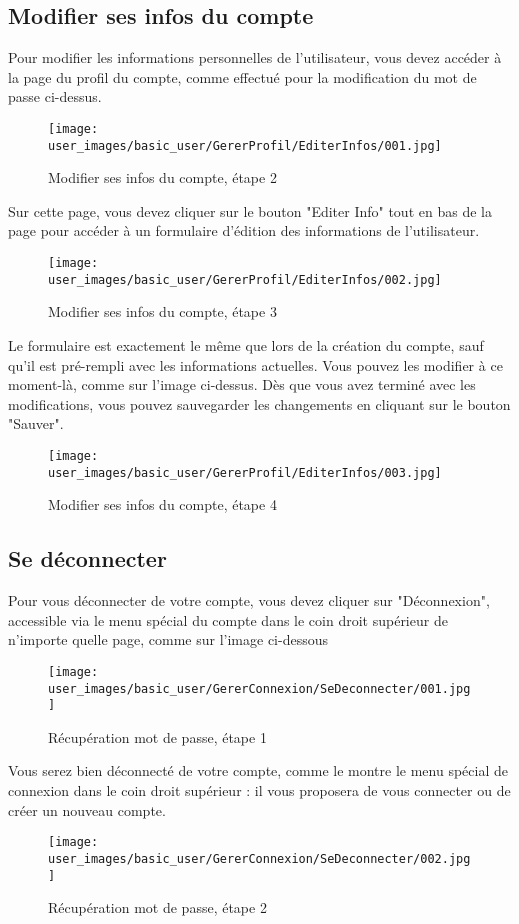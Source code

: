 \subsection{Modifier ses infos du compte}

Pour modifier les informations personnelles de l'utilisateur, vous devez accéder à la page du profil du compte, comme effectué pour la modification du mot de passe ci-dessus.

\begin{figure}[H]
\centering
\texttt{[image: user\_images/basic\_user/GererProfil/EditerInfos/001.jpg]}
\caption{Modifier ses infos du compte, étape 2}
\end{figure}

Sur cette page, vous devez cliquer sur le bouton "Editer Info" tout en bas de la page pour accéder à un formulaire d'édition des informations de l'utilisateur.

\begin{figure}[H]
\centering
\texttt{[image: user\_images/basic\_user/GererProfil/EditerInfos/002.jpg]}
\caption{Modifier ses infos du compte, étape 3}
\end{figure}

Le formulaire est exactement le même que lors de la création du compte, sauf qu'il est pré-rempli avec les informations actuelles. Vous pouvez les modifier à ce moment-là, comme sur l'image ci-dessus. Dès que vous avez terminé avec les modifications, vous pouvez sauvegarder les changements en cliquant sur le bouton "Sauver".

\begin{figure}[H]
\centering
\texttt{[image: user\_images/basic\_user/GererProfil/EditerInfos/003.jpg]}
\caption{Modifier ses infos du compte, étape 4}
\end{figure}

\subsection{Se déconnecter}

Pour vous déconnecter de votre compte, vous devez cliquer sur "Déconnexion", accessible via le menu spécial du compte dans le coin droit supérieur de n'importe quelle page, comme sur l'image ci-dessous

\begin{figure}[H]
\centering
\texttt{[image: user\_images/basic\_user/GererConnexion/SeDeconnecter/001.jpg]}
\caption{Récupération mot de passe, étape 1}
\end{figure}

Vous serez bien déconnecté de votre compte, comme le montre le menu spécial de connexion dans le coin droit supérieur : il vous proposera de vous connecter ou de créer un nouveau compte.

\begin{figure}[H]
\centering
\texttt{[image: user\_images/basic\_user/GererConnexion/SeDeconnecter/002.jpg]}
\caption{Récupération mot de passe, étape 2}
\end{figure}
